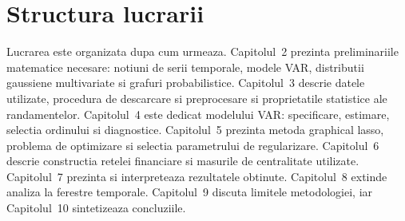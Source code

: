 \section{Structura lucrarii}

Lucrarea este organizata dupa cum urmeaza. Capitolul~2 prezinta preliminariile
matematice necesare: notiuni de serii temporale, modele VAR, distributii
gaussiene multivariate si grafuri probabilistice. Capitolul~3 descrie datele
utilizate, procedura de descarcare si preprocesare si proprietatile statistice
ale randamentelor. Capitolul~4 este dedicat modelului VAR: specificare, estimare,
selectia ordinului si diagnostice. Capitolul~5 prezinta metoda graphical lasso,
problema de optimizare si selectia parametrului de regularizare. Capitolul~6
descrie constructia retelei financiare si masurile de centralitate utilizate.
Capitolul~7 prezinta si interpreteaza rezultatele obtinute. Capitolul~8 extinde
analiza la ferestre temporale. Capitolul~9 discuta limitele metodologiei, iar
Capitolul~10 sintetizeaza concluziile.